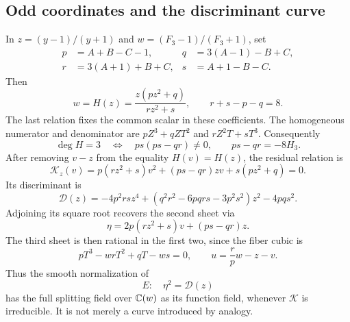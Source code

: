 \subsection{Odd coordinates and the discriminant curve}
In \(z=(y-1)/(y+1)\) and \(w=(F_3-1)/(F_3+1)\), set
\begin{equation}\label{eq:pqrs}
 \begin{aligned}
 p&=A+B-C-1,&q&=3(A-1)-B+C,\\
 r&=3(A+1)+B+C,&s&=A+1-B-C.
 \end{aligned}
\end{equation}
Then
\begin{equation}\label{eq:odd_cubic}
 w=H(z)=\frac{z(pz^2+q)}{rz^2+s},\qquad r+s-p-q=8.
\end{equation}
The last relation fixes the common scalar in these coefficients. The homogeneous numerator and denominator are \(pZ^3+qZT^2\) and \(rZ^2T+sT^3\). Consequently
\begin{equation}\label{eq:degree3}
 \deg H=3\quad\Longleftrightarrow\quad ps(ps-qr)\ne0,
 \qquad ps-qr=-8H_3.
\end{equation}
After removing \(v-z\) from the equality \(H(v)=H(z)\), the residual relation is
\begin{equation}\label{eq:K}
 \mathcal K_z(v)=p(rz^2+s)v^2+(ps-qr)zv+s(pz^2+q)=0.
\end{equation}
Its discriminant is
\begin{equation}\label{eq:D}
 \mathcal D(z)=-4p^2rsz^4+(q^2r^2-6pqrs-3p^2s^2)z^2-4pqs^2.
\end{equation}
Adjoining its square root recovers the second sheet via
\begin{equation}\label{eq:eta_incidence}
 \eta=2p(rz^2+s)v+(ps-qr)z.
\end{equation}
The third sheet is then rational in the first two, since the fiber cubic is
\begin{equation}\label{eq:fiber_cubic}
 pT^3-wrT^2+qT-ws=0,
 \qquad u=\frac rp w-z-v.
\end{equation}
Thus the smooth normalization of
\begin{equation}\label{eq:E}
 E:\quad\eta^2=\mathcal D(z)
\end{equation}
has the full splitting field over \(\mathbb C(w)\) as its function field, whenever \(\mathcal K\) is irreducible. It is not merely a curve introduced by analogy.

